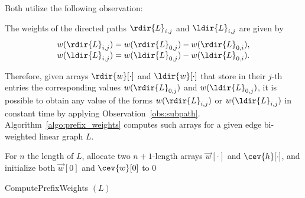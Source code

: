 Both utilize the following observation:

\begin{observation}
	\label{obs:subpath}
	The weights of the directed paths $\rdir{L}_{i, j}$ and $\ldir{L}_{i, j}$ are given by 	
	$$ \begin{array}{l}
		w(\rdir{L}_{i, j}) = w(\rdir{L}_{0, j}) - w(\rdir{L}_{0, i}), \\	
		w(\ldir{L}_{i, j}) = w(\ldir{L}_{0, j}) - w(\ldir{L}_{0, i}).
	\end{array}	$$
\end{observation}

Therefore, given arrays $\rdir{w}[\cdot]$ and $\ldir{w}[\cdot]$ that store in their $j$-th entries the corresponding values $w(\rdir{L}_{0, j})$ and $w(\ldir{L}_{0, j})$, it is possible to obtain any value of the forms $w(\rdir{L}_{i, j})$ or $w(\ldir{L}_{i, j})$ in constant time by applying Observation~\ref{obs:subpath}. Algorithm~\ref{algo:prefix_weights} computes such arrays for a given edge bi-weighted linear graph $L$.	

\begin{algorithm}
	For $n$ the length of $L$, allocate two $n+1$-length arrays $\vec{w}[\cdot]$ and $\cev{h}[\cdot]$, and initialize both $\vec{w}[0]$ and $\cev{w}[0]$ to $0$\;
	\;
	\caption{ComputePrefixWeights $(L)$}
	\label{algo:prefix_weights}
\end{algorithm}


